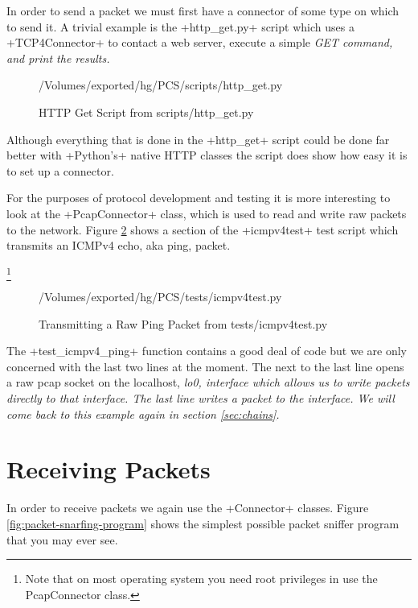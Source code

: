 \documentclass[11pt]{article}
\begin{document}
In order to send a packet we must first have a connector of some type
on which to send it.  A trivial example is the \file+http\_get.py+
script which uses a \class+TCP4Connector+ to contact a web server,
execute a simple \em{GET} command, and print the results.

\begin{figure}
  \centering
{/Volumes/exported/hg/PCS/scripts/http_get.py}
  \caption{HTTP Get Script from scripts/http\_get.py}
  \label{fig:http-get-script}
\end{figure}

Although everything that is done in the \program+http\_get+ script
could be done far better with \program+Python's+ native HTTP classes
the script does show how easy it is to set up a connector.

For the purposes of protocol development and testing it is more
interesting to look at the \class+PcapConnector+ class, which is used
to read and write raw packets to the network.  Figure
\ref{fig:transmitting-a-raw-ping-packet} shows a section of the
\program+icmpv4test+ test script which transmits an ICMPv4 echo, aka
ping, packet.  

\footnote{Note that on most operating system you need root privileges
  in use the PcapConnector class.}

\begin{figure}
{/Volumes/exported/hg/PCS/tests/icmpv4test.py}
  \caption{Transmitting a Raw Ping Packet from tests/icmpv4test.py}
  \label{fig:transmitting-a-raw-ping-packet}
\end{figure}

The \function+test\_icmpv4\_ping+ function contains a good deal of code
but we are only concerned with the last two lines at the moment.  The
next to the last line opens a raw pcap socket on the localhost,
\em{lo0}, interface which allows us to write packets directly to that
interface.  The last line writes a packet to the interface.  We will
come back to this example again in section \ref{sec:chains}.

\section{Receiving Packets}
\label{sec:receiving-packets}

In order to receive packets we again use the \class+Connector+
classes.  Figure \ref{fig:packet-snarfing-program} shows the simplest
possible packet sniffer program that you may ever see.
\end{document}
